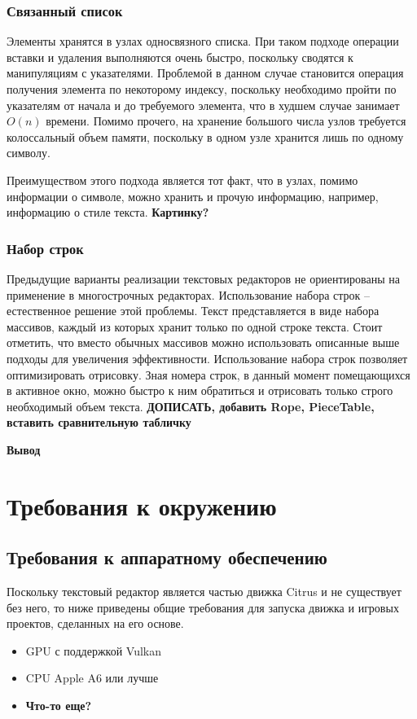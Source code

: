 \documentclass{fefu}
\begin{document}
			\subsubsection{Связанный список}
				\par Элементы хранятся в узлах односвязного списка. При таком подходе операции
				вставки и удаления выполняются очень быстро, поскольку сводятся к манипуляциям
				с указателями. Проблемой в данном случае становится операция получения элемента
				по некоторому индексу, поскольку необходимо пройти по указателям от начала и до
				требуемого элемента, что в худшем случае занимает $O(n)$ времени. Помимо
				прочего, на хранение большого числа узлов требуется колоссальный объем памяти, 
				поскольку в одном узле хранится лишь по одному символу. 
				\par Преимуществом этого подхода является тот факт, что в узлах, помимо
				информации о символе, можно хранить и прочую информацию, например, информацию
				о стиле текста.
				\textbf{Картинку?}
			\subsubsection{Набор строк}
				\par Предыдущие варианты реализации текстовых редакторов не ориентированы на
				применение в многострочных редакторах. Использование набора строк --
				естественное решение этой проблемы. Текст представляется в виде набора
				массивов, каждый из которых хранит только по одной строке текста. Стоит
				отметить, что вместо обычных массивов можно использовать описанные выше
				подходы для увеличения эффективности. Использование набора строк позволяет
				оптимизировать отрисовку. Зная номера строк, в данный момент помещающихся в 
				активное окно, можно быстро к ним обратиться и отрисовать только строго
				необходимый объем текста. \textbf{ДОПИСАТЬ, добавить Rope, PieceTable, 
				вставить сравнительную табличку}
		\par \textbf{Вывод}
	\section{Требования к окружению}
		\subsection{Требования к аппаратному обеспечению}
			\par Поскольку текстовый редактор является частью движка Citrus и не существует 
			без него, то ниже приведены общие требования для запуска движка и игровых проектов,
			сделанных на его основе.
			\begin{itemize}
				\item GPU с поддержкой Vulkan
				\item CPU Apple A6  или лучше
				\item \textbf{Что-то еще?}
			\end{itemize}
\end{document}
